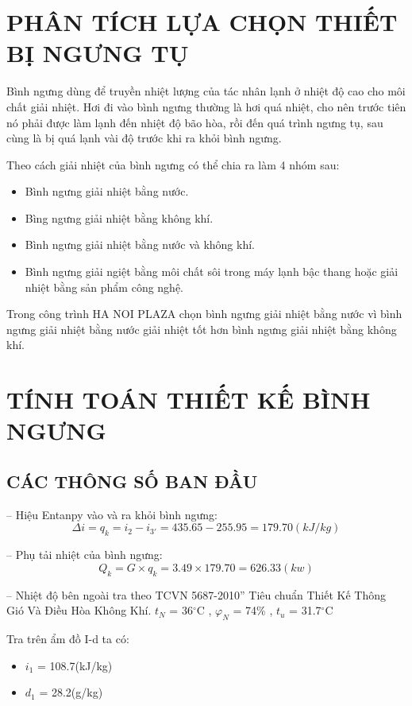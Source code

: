 \section{PHÂN TÍCH LỰA CHỌN THIẾT BỊ NGƯNG TỤ}
Bình ngưng dùng để truyền nhiệt lượng của tác nhân lạnh ở nhiệt độ cao cho môi chất giải nhiệt. Hơi đi vào bình ngưng thường là hơi quá nhiệt, cho nên trước tiên nó phải được làm lạnh đến nhiệt độ bão hòa, rồi đến quá trình ngưng tụ, sau cùng là bị quá lạnh vài độ trước khi ra khỏi bình ngưng.

Theo cách giải nhiệt của bình ngưng có thể chia ra làm 4 nhóm sau:
\begin{itemize}
	\item Bình ngưng giải nhiệt bằng nước.
	\item Bìng ngưng giải nhiệt bằng không khí.
	\item Bình ngưng giải nhiệt bằng nước và không khí.
	\item Bình ngưng giải ngiệt bằng môi chất sôi trong máy lạnh bậc thang hoặc giải nhiệt bằng sản phẩm công nghệ.
\end{itemize}

Trong công trình HA NOI PLAZA chọn bình ngưng giải nhiệt bằng nước vì bình ngưng giải nhiệt bằng nước giải nhiệt tốt hơn bình ngưng giải nhiệt bằng không khí.
\section{TÍNH TOÁN THIẾT KẾ BÌNH NGƯNG}
\subsection{CÁC THÔNG SỐ BAN ĐẦU}
-- Hiệu Entanpy vào và ra khỏi bình ngưng:
\begin{equation*}
	\Delta i = q_{k} = i_{2} - i_{3'} = 435.65 - 255.95 = 179.70(kJ/kg)
\end{equation*}

-- Phụ tải nhiệt của bình ngưng:
\begin{equation*}
    Q_{k} = G\times q_{k} = 3.49 \times 179.70 = 626.33(kw)
\end{equation*}

-- Nhiệt độ bên ngoài tra theo TCVN 5687-2010” Tiêu chuẩn Thiết Kế Thông Gió Và Điều Hòa Không Khí.
$t_{N}$ = 36$^{\circ}$C , $\varphi_{N}$ = 74\% , $t_{u}$ = 31.7$^{\circ}$C 

Tra trên ẩm đồ I-d ta có:
\begin{itemize}
	\item $i_{1}$ =  108.7(kJ/kg)
	\item $d_{1}$ =  28.2(g/kg)
\end{itemize}

